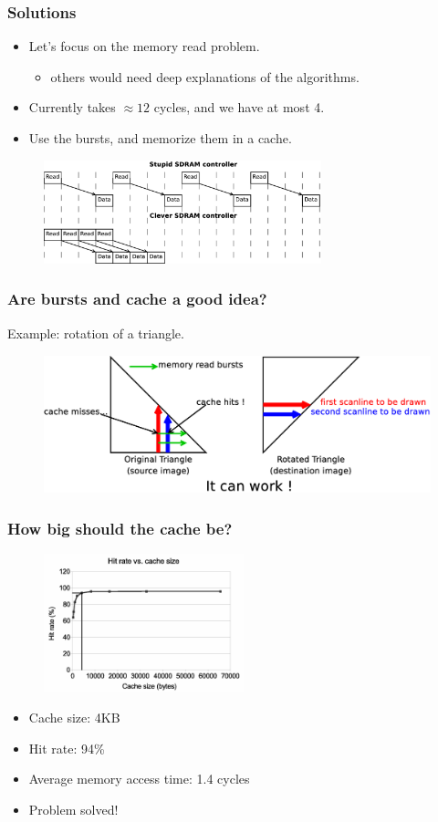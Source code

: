 \documentclass{beamer}
\begin{document}
\frame
{
  \frametitle{Solutions}
  
  \begin{itemize}
  \item Let's focus on the memory read problem.
  \begin{itemize}
  \item others would need deep explanations of the algorithms.
  \end{itemize}
  \item Currently takes $\approx12$ cycles, and we have at most 4.
  \item Use the bursts, and memorize them in a cache.
  \end{itemize}
  \begin{figure}[H]
  \includegraphics[height=30mm]{memlatency.eps}
  \end{figure}
}

\frame
{
  \frametitle{Are bursts and cache a good idea?}
  
  Example: rotation of a triangle.
  \begin{figure}[H]
  \includegraphics[height=40mm]{tripattern.eps}
  \end{figure}
}

\frame
{
  \frametitle{How big should the cache be?}
  \begin{figure}[H]
  \includegraphics[height=40mm]{texelcache.eps}
  \end{figure}
  \begin{itemize}
  \item Cache size: 4KB
  \item Hit rate: 94\%
  \item Average memory access time: 1.4 cycles
  \item Problem solved!
  \end{itemize}
}
\end{document}
